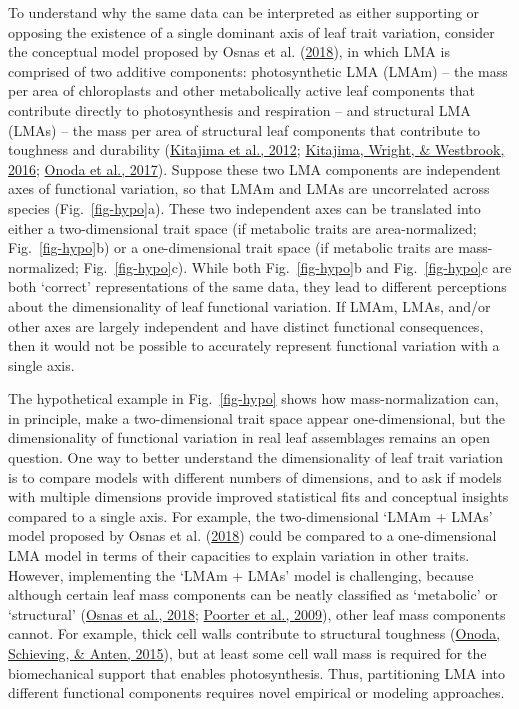 \documentclass[
  12pt,
  letterpaper,
  DIV=11,
  numbers=noendperiod]{scrartcl}
\begin{document}
To understand why the same data can be interpreted as either supporting
or opposing the existence of a single dominant axis of leaf trait
variation, consider the conceptual model proposed by Osnas et al.
(\protect\hyperlink{ref-Osnas2018}{2018}), in which LMA is comprised of
two additive components: photosynthetic LMA (LMAm) -- the mass per area
of chloroplasts and other metabolically active leaf components that
contribute directly to photosynthesis and respiration -- and structural
LMA (LMAs) -- the mass per area of structural leaf components that
contribute to toughness and durability
(\protect\hyperlink{ref-Kitajima2012}{Kitajima et al., 2012};
\protect\hyperlink{ref-Kitajima2016}{Kitajima, Wright, \& Westbrook,
2016}; \protect\hyperlink{ref-Onoda2017}{Onoda et al., 2017}). Suppose
these two LMA components are independent axes of functional variation,
so that LMAm and LMAs are uncorrelated across species
(Fig.~\ref{fig-hypo}a). These two independent axes can be translated
into either a two-dimensional trait space (if metabolic traits are
area-normalized; Fig.~\ref{fig-hypo}b) or a one-dimensional trait space
(if metabolic traits are mass-normalized; Fig.~\ref{fig-hypo}c). While
both Fig.~\ref{fig-hypo}b and Fig.~\ref{fig-hypo}c are both `correct'
representations of the same data, they lead to different perceptions
about the dimensionality of leaf functional variation. If LMAm, LMAs,
and/or other axes are largely independent and have distinct functional
consequences, then it would not be possible to accurately represent
functional variation with a single axis.

The hypothetical example in Fig.~\ref{fig-hypo} shows how
mass-normalization can, in principle, make a two-dimensional trait space
appear one-dimensional, but the dimensionality of functional variation
in real leaf assemblages remains an open question. One way to better
understand the dimensionality of leaf trait variation is to compare
models with different numbers of dimensions, and to ask if models with
multiple dimensions provide improved statistical fits and conceptual
insights compared to a single axis. For example, the two-dimensional
`LMAm + LMAs' model proposed by Osnas et al.
(\protect\hyperlink{ref-Osnas2018}{2018}) could be compared to a
one-dimensional LMA model in terms of their capacities to explain
variation in other traits. However, implementing the `LMAm + LMAs' model
is challenging, because although certain leaf mass components can be
neatly classified as `metabolic' or `structural'
(\protect\hyperlink{ref-Osnas2018}{Osnas et al., 2018};
\protect\hyperlink{ref-Poorter2009}{Poorter et al., 2009}), other leaf
mass components cannot. For example, thick cell walls contribute to
structural toughness (\protect\hyperlink{ref-Onoda2015}{Onoda,
Schieving, \& Anten, 2015}), but at least some cell wall mass is
required for the biomechanical support that enables photosynthesis.
Thus, partitioning LMA into different functional components requires
novel empirical or modeling approaches.
\end{document}
